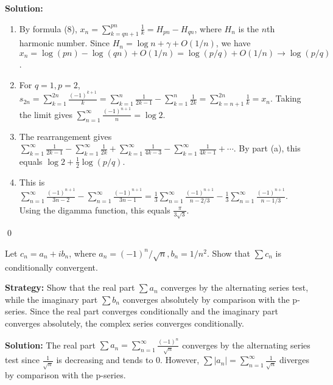 \bigskip\noindent\textbf{Solution:}
\begin{enumerate}[label=(\alph*)]
\item By formula (8), \(x_n = \sum_{k=qn+1}^{pn} \frac{1}{k} = H_{pn} - H_{qn}\), where \(H_n\) is the \(n\)th harmonic number. Since \(H_n = \log n + \gamma + O(1/n)\), we have \(x_n = \log(pn) - \log(qn) + O(1/n) = \log(p/q) + O(1/n) \to \log(p/q)\).

\item For \(q=1, p=2\), \(s_{2n} = \sum_{k=1}^{2n} \frac{(-1)^{k+1}}{k} = \sum_{k=1}^{n} \frac{1}{2k-1} - \sum_{k=1}^{n} \frac{1}{2k} = \sum_{k=n+1}^{2n} \frac{1}{k} = x_n\). Taking the limit gives \(\sum_{n=1}^{\infty} \frac{(-1)^{n+1}}{n} = \log 2\).

\item The rearrangement gives \(\sum_{k=1}^{\infty} \frac{1}{2k-1} - \sum_{k=1}^{\infty} \frac{1}{2k} + \sum_{k=1}^{\infty} \frac{1}{4k-3} - \sum_{k=1}^{\infty} \frac{1}{4k-1} + \cdots\). By part (a), this equals \(\log 2 + \frac{1}{2}\log(p/q)\).

\item This is \(\sum_{n=1}^{\infty} \frac{(-1)^{n+1}}{3n-2} - \sum_{n=1}^{\infty} \frac{(-1)^{n+1}}{3n-1} = \frac{1}{3}\sum_{n=1}^{\infty} \frac{(-1)^{n+1}}{n-2/3} - \frac{1}{3}\sum_{n=1}^{\infty} \frac{(-1)^{n+1}}{n-1/3}\). Using the digamma function, this equals \(\frac{\pi}{3\sqrt{3}}\).
\end{enumerate}\qed



\begin{problembox}
\begin{problemstatement}
Let \(c_n = a_n + ib_n\), where \(a_n = (-1)^n/\sqrt{n}, b_n = 1/n^2\). Show that \(\sum c_n\) is conditionally convergent.
\end{problemstatement}
\end{problembox}

\noindent\textbf{Strategy:} Show that the real part \(\sum a_n\) converges by the alternating series test, while the imaginary part \(\sum b_n\) converges absolutely by comparison with the p-series. Since the real part converges conditionally and the imaginary part converges absolutely, the complex series converges conditionally.

\bigskip\noindent\textbf{Solution:}
The real part \(\sum a_n = \sum_{n=1}^{\infty} \frac{(-1)^n}{\sqrt{n}}\) converges by the alternating series test since \(\frac{1}{\sqrt{n}}\) is decreasing and tends to 0. However, \(\sum |a_n| = \sum_{n=1}^{\infty} \frac{1}{\sqrt{n}}\) diverges by comparison with the p-series.

